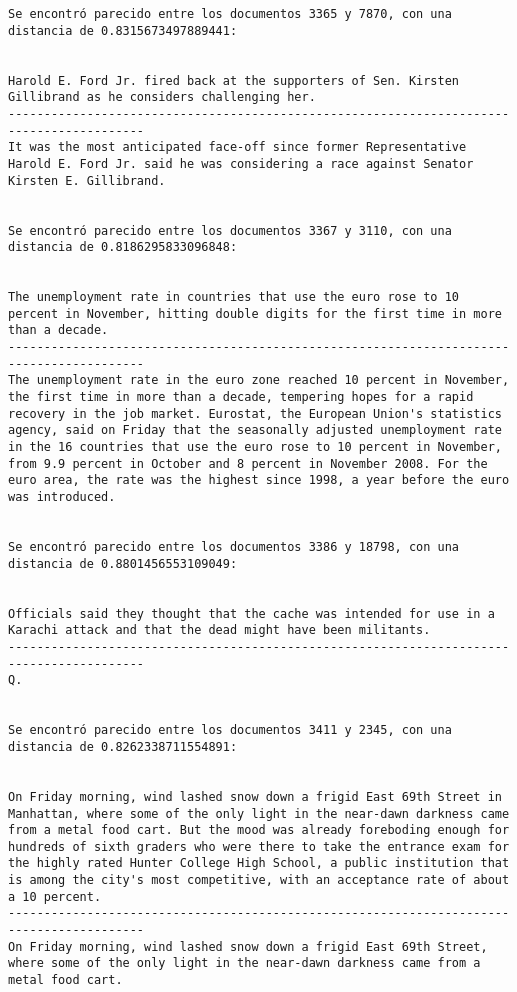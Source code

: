 \documentclass[11pt]{article}
\begin{document}
\begin{Verbatim}[commandchars=\\\{\}]
Se encontró parecido entre los documentos 3365 y 7870, con una distancia de 0.8315673497889441:


Harold E. Ford Jr. fired back at the supporters of Sen. Kirsten Gillibrand as he considers challenging her.
-----------------------------------------------------------------------------------------
It was the most anticipated face-off since former Representative Harold E. Ford Jr. said he was considering a race against Senator Kirsten E. Gillibrand.


Se encontró parecido entre los documentos 3367 y 3110, con una distancia de 0.8186295833096848:


The unemployment rate in countries that use the euro rose to 10 percent in November, hitting double digits for the first time in more than a decade.
-----------------------------------------------------------------------------------------
The unemployment rate in the euro zone reached 10 percent in November, the first time in more than a decade, tempering hopes for a rapid recovery in the job market. Eurostat, the European Union's statistics agency, said on Friday that the seasonally adjusted unemployment rate in the 16 countries that use the euro rose to 10 percent in November, from 9.9 percent in October and 8 percent in November 2008. For the euro area, the rate was the highest since 1998, a year before the euro was introduced.


Se encontró parecido entre los documentos 3386 y 18798, con una distancia de 0.8801456553109049:


Officials said they thought that the cache was intended for use in a Karachi attack and that the dead might have been militants.
-----------------------------------------------------------------------------------------
Q.


Se encontró parecido entre los documentos 3411 y 2345, con una distancia de 0.8262338711554891:


On Friday morning, wind lashed snow down a frigid East 69th Street in Manhattan, where some of the only light in the near-dawn darkness came from a metal food cart. But the mood was already foreboding enough for hundreds of sixth graders who were there to take the entrance exam for the highly rated Hunter College High School, a public institution that is among the city's most competitive, with an acceptance rate of about a 10 percent.
-----------------------------------------------------------------------------------------
On Friday morning, wind lashed snow down a frigid East 69th Street, where some of the only light in the near-dawn darkness came from a metal food cart.



\end{Verbatim}
\end{document}
